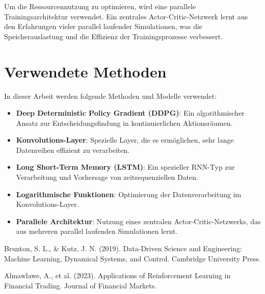Um die Ressourcennutzung zu optimieren, wird eine parallele Trainingsarchitektur verwendet. Ein zentrales Actor-Critic-Netzwerk lernt aus den Erfahrungen vieler parallel laufender Simulationen, was die Speicherauslastung und die Effizienz der Trainingsprozesse verbessert.

\section{Verwendete Methoden}
In dieser Arbeit werden folgende Methoden und Modelle verwendet:
\begin{itemize}
    \item \textbf{Deep Deterministic Policy Gradient (DDPG)}: Ein algorithmischer Ansatz zur Entscheidungsfindung in kontinuierlichen Aktionsräumen.
    \item \textbf{Konvolutions-Layer}: Spezielle Layer, die es ermöglichen, sehr lange Datenreihen effizient zu verarbeiten.
    \item \textbf{Long Short-Term Memory (LSTM)}: Ein spezieller RNN-Typ zur Verarbeitung und Vorhersage von zeitsequenziellen Daten.
    \item \textbf{Logarithmische Funktionen}: Optimierung der Datenverarbeitung im Konvolutions-Layer.
    \item \textbf{Parallele Architektur}: Nutzung eines zentralen Actor-Critic-Netzwerks, das aus mehreren parallel laufenden Simulationen lernt.
\end{itemize}

\begin{thebibliography}{9}
Brunton, S. L., \& Kutz, J. N. (2019). Data-Driven Science and Engineering: Machine Learning, Dynamical Systems, and Control. Cambridge University Press.

Almawlawe, A., et al. (2023). Applications of Reinforcement Learning in Financial Trading. Journal of Financial Markets.

\end{thebibliography}
